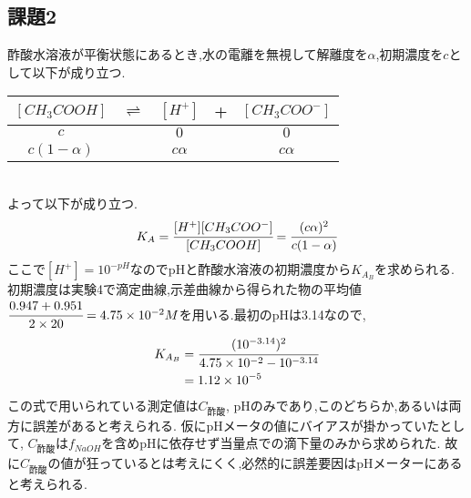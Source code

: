 \subsection{課題2}
酢酸水溶液が平衡状態にあるとき,水の電離を無視して解離度を$\alpha$,初期濃度を$c$として以下が成り立つ.
\begin{table}[h]
   \centering
   \begin{tabular}{ccccc}
     \hline
     $[CH_3COOH]$&$\rightleftharpoons$&$[H^+]$&+&$[CH_3COO^-]$\\
     \hline
     $c$&&$0$&&$0$\\
     $c(1-\alpha)$&&$c\alpha$&&$c\alpha$\\
     \hline
   \end{tabular}
\end{table}\\
よって以下が成り立つ.
\begin{equation}
  \label{equ:KAB}
  K_A=\cfrac{[H^+][CH_3COO^-]}{[CH_3COOH]}=\cfrac{(c\alpha)^2}{c(1-\alpha)}
\end{equation}
ここで$[H^+]=10^{-pH}$なのでpHと酢酸水溶液の初期濃度から$K_{A_B}$を求められる.
初期濃度は実験4で滴定曲線,示差曲線から得られた物の平均値$\cfrac{0.947+0.951}{2\times20}=4.75\times10^{-2}M$を用いる.最初のpHは3.14なので,
\begin{align*}
  K_{A_B}&=\cfrac{(10^{-3.14})^2}{4.75\times10^{-2}-10^{-3.14}}\\
  &=1.12\times10^{-5}
\end{align*}
この式で用いられている測定値は$C_{酢酸}$, pHのみであり,このどちらか,あるいは両方に誤差があると考えられる.
仮にpHメータの値にバイアスが掛かっていたとして, $C_{酢酸}$は$f_{NaOH}$を含めpHに依存せず当量点での滴下量のみから求められた.
故に$C_{酢酸}$の値が狂っているとは考えにくく,必然的に誤差要因はpHメーターにあると考えられる.